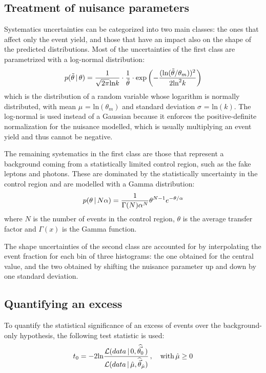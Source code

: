 \subsection{Treatment of nuisance parameters}
Systematics uncertainties can be categorized into two main classes: the ones that affect only the event yield, and those that have an impact also on the shape of the predicted distributions.
Most of the uncertainties of the first class are parametrized with a log-normal distribution:
\begin{equation}
  \label{eq:lnNdef}
  p(\tilde{\theta}\,|\,\theta) = \frac{1}{\sqrt{2 \pi} \text{ln} k} \cdot \frac{1}{\tilde{\theta}} \cdot \text{exp} \left( -\frac{(\text{ln}(\tilde{\theta}/\theta_m))^2}{2 \text{ln}^2 k} \right)
\end{equation}
which is the distribution of a random variable whose logarithm is normally distributed, with mean $\mu$ = $\text{ln}(\theta_m)$ and standard deviation $\sigma$ = $\text{ln}(k)$.
The log-normal is used instead of a Gaussian because it enforces the positive-definite normalization for the nuisance modelled, which is usually multiplying an event yield and thus cannot be negative.

The remaining systematics in the first class are those that represent a background coming from a statistically limited control region, such as the fake leptons and photons.
These are dominated by the statistically uncertainty in the control region and are modelled with a Gamma distribution:
\begin{equation}
  \label{eq:gammadef}
  p(\theta\,|\,N\alpha) = \frac{1}{\Gamma(N) \alpha^N} \theta^{N-1} e^{-\theta/\alpha}
\end{equation}
where $N$ is the number of events in the control region, $\theta$ is the average transfer factor and $\Gamma(x)$ is the Gamma function.

The shape uncertainties of the second class are accounted for by interpolating the event fraction for each bin of three histograms: the one obtained for the central value, and the two obtained by shifting the nuisance parameter up and down by one standard deviation.

\subsection{Quantifying an excess}
To quantify the statistical significance of an excess of events over the background-only hypothesis, the following test statistic is used:
\begin{equation}
  \label{eq:test_statistic}
  t_0 = -2\text{ln} \frac {\mathcal{L}(data\,|\,0,\widehat{\vec{\theta_0}}\,)} {\mathcal{L}(data\,|\,\hat\mu,\widehat{\vec\theta}_{\hat\mu})}\,,\quad \text{with}\, \hat\mu \ge 0
\end{equation}

